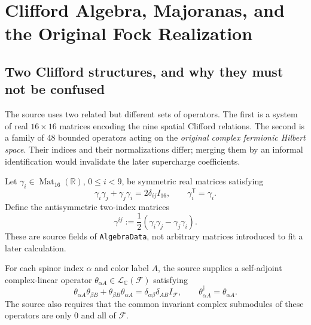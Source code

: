 \chapter[Clifford Algebra and Fock Realization]{Clifford Algebra, Majoranas, and the Original Fock Realization}
\label{ch:clifford}

\section{Two Clifford structures, and why they must not be confused}
The source uses two related but different sets of operators. The first is a
system of real $16\times16$ matrices encoding the nine spatial Clifford
relations. The second is a family of 48 bounded operators acting on the
\emph{original complex fermionic Hilbert space}. Their indices and their
normalizations differ; merging them by an informal identification would
invalidate the later supercharge coefficients.

\begin{definition}
Let $\gamma_i\in\operatorname{Mat}_{16}(\mathbb R)$, $0\le i<9$,
be symmetric real matrices satisfying
\begin{equation}\label{eq:gamma-clifford}
 \gamma_i\gamma_j+\gamma_j\gamma_i
 =2\delta_{ij}I_{16},\qquad \gamma_i^{\mathsf T}=\gamma_i.
\end{equation}
Define the antisymmetric two-index matrices
\begin{equation}\label{eq:gamma-two}
 \gamma^{ij}:=\frac12(\gamma_i\gamma_j-\gamma_j\gamma_i).
\end{equation}
These are source fields of \texttt{AlgebraData}, not arbitrary matrices
introduced to fit a later calculation.
\end{definition}

\begin{definition}
For each spinor index $\alpha$ and color label $A$, the source supplies a
self-adjoint complex-linear operator
$\theta_{\alpha A}\in\mathcal L_{\mathbb C}(\mathcal F)$ satisfying
\begin{equation}\label{eq:theta-car}
 \theta_{\alpha A}\theta_{\beta B}
 +\theta_{\beta B}\theta_{\alpha A}
 =\delta_{\alpha\beta}\delta_{AB}I_{\mathcal F},
 \qquad \theta_{\alpha A}^{\dagger}=\theta_{\alpha A}.
\end{equation}
The source also requires that the common invariant complex submodules of
these operators are only $0$ and all of $\mathcal F$.
\end{definition}

